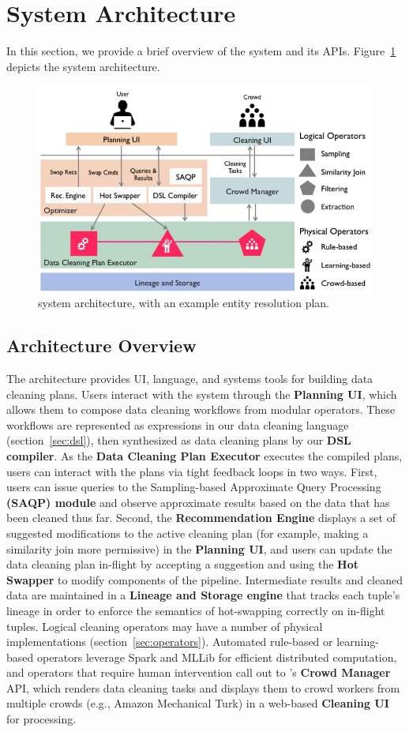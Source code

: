 \section{System Architecture}

In this section, we provide a brief overview of the \sys system and its APIs.
Figure~\ref{fig:arch} depicts the system architecture.

\begin{figure}[t]
\centering
\vspace{-0.5cm}
\includegraphics[width = .5\textwidth]{figs/architecture.png}
\vspace{-0.6cm}
\caption{\sys system architecture, with an example entity resolution plan.}
\vspace{-0.6cm}
\label{fig:arch}
\end{figure}

\subsection{Architecture Overview}
The \sys architecture provides UI, language, and systems tools for building data cleaning plans.
Users interact with the system through the \textbf{Planning UI}, which allows them to compose data cleaning workflows from modular operators.
These workflows are represented as expressions in our data cleaning language (section~\ref{sec:dsl}), then synthesized as data cleaning plans by our \textbf{DSL compiler}.
As the \textbf{Data Cleaning Plan Executor} executes the compiled plans, users can interact with the plans via tight feedback loops in two ways.
First, users can issue queries to the Sampling-based Approximate Query Processing \textbf{(SAQP) module} and observe approximate results based on the data that has been cleaned thus far.
Second, the \textbf{Recommendation Engine} displays a set of suggested modifications to the active cleaning plan (for example, making a similarity join more permissive) in the \textbf{Planning UI}, and users can update the data cleaning plan in-flight by accepting a suggestion and using the \textbf{Hot Swapper} to modify components of the pipeline.
Intermediate results and cleaned data are maintained in a \textbf{Lineage and Storage engine} that tracks each tuple's lineage in order to enforce the semantics of hot-swapping correctly on in-flight tuples.
Logical cleaning operators may have a number of physical implementations (section~\ref{sec:operators}).
Automated rule-based or learning-based operators leverage Spark and MLLib for efficient distributed computation, and operators that require human intervention call out to \sys's \textbf{Crowd Manager} API, which renders data cleaning tasks and displays them to crowd workers from multiple crowds (e.g., Amazon Mechanical Turk) in a web-based \textbf{Cleaning UI} for processing.

